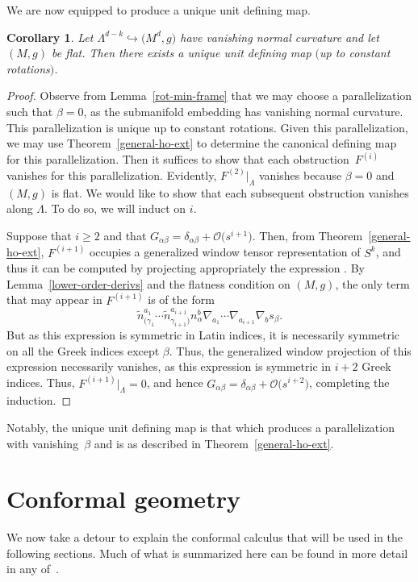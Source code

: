 \documentclass[pdftex]{sigma}
\numberwithin{equation}{section}
\newtheorem{Corollary}[Theorem]{Corollary}
\renewcommand{\=}{\stackrel \Lambda =}
\begin{document}
We are now equipped to produce a unique unit defining map.
\begin{Corollary}
Let $\Lambda^{d-k} \hookrightarrow \bigl(M^d,g\bigr)$ have vanishing normal curvature and let $(M,g)$ be flat. Then there exists a unique unit defining map $($up to constant rotations$)$.
\end{Corollary}
\begin{proof}
Observe from Lemma~\ref{rot-min-frame} that we may choose a parallelization such that $\beta = 0$, as the submanifold embedding has vanishing normal curvature. This parallelization is unique up to constant rotations. Given this parallelization, we may use Theorem~\ref{general-ho-ext} to determine the canonical defining map for this parallelization. Then it suffices to show that each obstruction~$F^{(i)}$ vanishes for this parallelization. Evidently, $F^{(2)}|_{\Lambda}$ vanishes because $\beta = 0$ and $(M,g)$ is flat. We would like to show that each subsequent obstruction vanishes along $\Lambda$. To do so, we will induct on $i$.

Suppose that $i \geq 2$ and that $G_{\alpha \beta} = \delta_{\alpha \beta} + \mathcal{O}\bigl(s^{i+1}\bigr)$. Then, from Theorem~\ref{general-ho-ext}, $F^{(i+1)}$ occupies a generalized window tensor representation of $S^k$, and thus it can be computed by projecting appropriately the expression . By Lemma~\ref{lower-order-derivs} and the flatness condition on $(M,g)$, the only term that may appear in $F^{(i+1)}$ is of the form
\[
\tilde{n}^{a_1}_{(\gamma_1} \cdots \tilde{n}^{a_{i+1}}_{\gamma_{i+1})} n^b_{\alpha} \nabla_{a_1} \cdots \nabla_{a_{i+1}} \nabla_b s_{\beta} .
\]
But as this expression is symmetric in Latin indices, it is necessarily symmetric on all the Greek indices except $\beta$. Thus, the generalized window projection of this expression necessarily vanishes, as this expression is symmetric in $i+2$ Greek indices. Thus, $F^{(i+1)}|_{\Lambda} = 0$, and hence $G_{\alpha \beta} = \delta_{\alpha \beta} + \mathcal{O}\bigl(s^{i+2}\bigr)$, completing the induction.
\end{proof}

Notably, the unique unit defining map is that which produces a parallelization with vanishing~$\beta$ and is as described in Theorem~\ref{general-ho-ext}.

\section{Conformal geometry}\label{conf-geom-sec}
We now take a detour to explain the conformal calculus that will be used in the following sections. Much of what is summarized here can be found in more detail in any of~\cite{BEG,CapGover1999,CapGover2003,GOpet,GW}.
\end{document}
